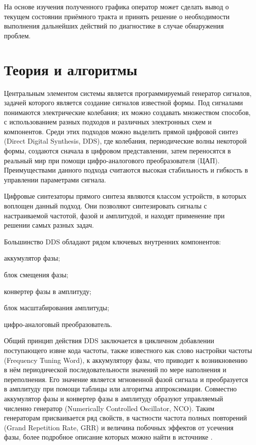 \documentclass{report}
\begin{document}

На основе изучения полученного графика оператор может сделать вывод о текущем состоянии приёмного тракта и принять решение о необходимости выполнения дальнейших действий по диагностике в случае обнаружения проблем.

\section{Теория и алгоритмы}

Центральным элементом системы является программируемый генератор сигналов, задачей которого является создание сигналов известной формы. Под сигналами понимаются электрические колебания; их можно создавать множеством способов, с использованием разных подходов и различных электронных схем и компонентов. Среди этих подходов можно выделить прямой цифровой синтез (Direct Digital Synthesis, DDS), где колебания, периодические волны некоторой формы, создаются сначала в цифровом представлении, затем переносятся в реальный мир при помощи цифро-аналогового преобразователя (ЦАП). Преимуществами данного подхода считаются высокая стабильность и гибкость в управлении параметрами сигнала.

Цифровые синтезаторы прямого синтеза являются классом устройств, в которых воплощен данный подход. Они позволяют синтезировать сигналы с настраиваемой частотой, фазой и амплитудой, и находят применение при решении самых разных задач.

Большинство DDS обладают рядом ключевых внутренних компонентов:

\begin{enummarker}
    \item аккумулятор фазы;
    \item блок смещения фазы;
    \item конвертер фазы в амплитуду;
    \item блок масштабирования амплитуды;
    \item цифро-аналоговый преобразователь.
\end{enummarker}

Общий принцип действия DDS заключается в цикличном добавлении поступающего извне кода частоты, также известного как слово настройки частоты (Frequency Tuning Word), к аккумулятору фазы, что приводит к возникновению в нём периодической последовательности значений по мере наполнения и переполнения. Его значение является мгновенной фазой сигнала и преобразуется в амплитуду при помощи таблицы или алгоритма аппроксимации. Совместно аккумулятор фазы и конвертер фазы в амплитуду образуют управляемый численно генератор (Numerically Controlled Oscillator, NCO). Таким генераторам присваивается ряд свойств, в частности частота полных повторений (Grand Repetition Rate, GRR) и величина побочных эффектов от усечения фазы, более подробное описание которых можно найти в источнике \cite{dds_tutorial}.
\end{document}
